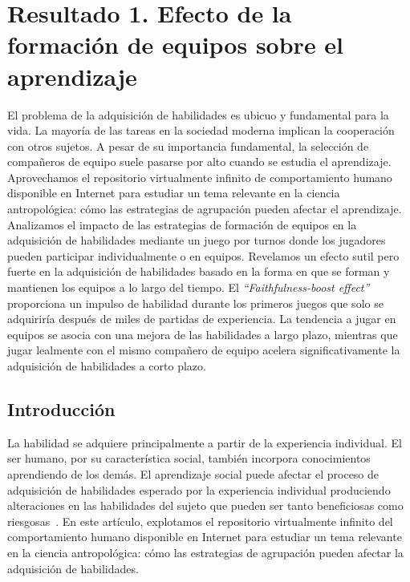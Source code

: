 \documentclass[a4paper,11pt]{book}
\theoremstyle{definition}
\begin{document}
\chapter{Resultado 1. Efecto de la formaci\'on de equipos sobre el aprendizaje}\label{ch:team}


El problema de la adquisici\'on de habilidades es ubicuo y fundamental para la vida.
%
La mayor\'ia de las tareas en la sociedad moderna implican la cooperaci\'on con otros sujetos.
%
A pesar de su importancia fundamental, la selecci\'on de compañeros de equipo suele pasarse por alto cuando se estudia el aprendizaje.
%
Aprovechamos el repositorio virtualmente infinito de comportamiento humano disponible en Internet para estudiar un tema relevante en la ciencia antropol\'ogica: c\'omo las estrategias de agrupaci\'on pueden afectar el aprendizaje.
%
Analizamos el impacto de las estrategias de formaci\'on de equipos en la adquisici\'on de habilidades mediante un juego por turnos donde los jugadores pueden participar individualmente o en equipos.
%
Revelamos un efecto sutil pero fuerte en la adquisici\'on de habilidades basado en la forma en que se forman y mantienen los equipos a lo largo del tiempo.
%
El \emph{``Faithfulness-boost effect''} proporciona un impulso de habilidad durante los primeros juegos que solo se adquirir\'ia después de miles de partidas de experiencia.
%
La tendencia a jugar en equipos se asocia con una mejora de las habilidades a largo plazo, mientras que jugar lealmente con el mismo compañero de equipo acelera significativamente la adquisici\'on de habilidades a corto plazo.

\section{Introducci\'on}

La habilidad se adquiere principalmente a partir de la experiencia individual.
%
El ser humano, por su caracter\'istica social, también incorpora conocimientos aprendiendo de los demás.
%
El aprendizaje social puede afectar el proceso de adquisici\'on de habilidades esperado por la experiencia individual produciendo alteraciones en las habilidades del sujeto que pueden ser tanto beneficiosas como riesgosas~\cite{Boyd2011}.
%
En este art\'iculo, explotamos el repositorio virtualmente infinito del comportamiento humano disponible en Internet para estudiar un tema relevante en la ciencia antropol\'ogica: c\'omo las estrategias de agrupaci\'on pueden afectar la adquisici\'on de habilidades.
\end{document}
